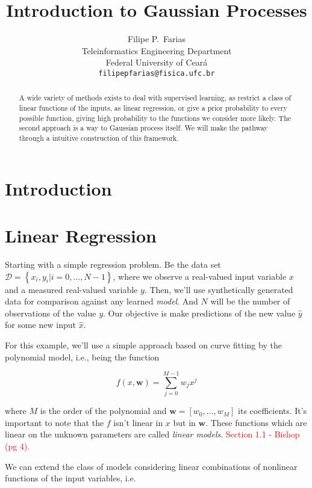 \documentclass[11pt]{article} %
\title{Introduction to Gaussian Processes}
\author{
Filipe P.~Farias \\
Teleinformatics Engineering Department\\
Federal University of Ceará\\
\texttt{filipepfarias@fisica.ufc.br} \\
}
\begin{document}
\maketitle

\begin{abstract}
   A wide variety of methods exists to deal with supervised learning, as restrict a class of linear functions of the inputs, as linear regression, or give a prior probability to every possible function, giving high probability to the functions we consider more likely. The second approach is a way to Gaussian process itself. We will make the pathway through a intuitive construction of this framework.
\end{abstract}

\section{Introduction}

\lipsum[1]%

\section{Linear Regression}

Starting with a simple regression problem. Be the data set $\mathcal{D}=\left\{ x_i,y_i|i=0,\dots,N-1 \right\}$, where we observe a real-valued input variable $x$ and a measured real-valued variable $y$. Then, we'll use synthetically generated data for comparison against any learned \textit{model}. And $N$ will be the number of observations of the value $y$. Our objective is make predictions of the new value $\hat{y}$ for some new input $\hat{x}$.

For this example, we'll use a simple approach based on curve fitting by the polynomial model, i.e., being the function

\begin{equation}
   f(x,\mathbf{w}) = \sum_{j=0}^{M-1} w_j x^j
\end{equation}

where $M$ is the order of the polynomial and $\mathbf{w}=\left[ w_0,\dots,w_M \right]$ its coefficients. It's important to note that the $f$ isn't linear in $x$ but in $\mathbf{w}$. These functions which are linear on the unknown parameters are called \textit{linear models}.
\textcolor{red}{Section 1.1 - Bishop (pg 4).}

We can extend the class of models considering linear combinations of nonlinear functions of the input variables, i.e.
\end{document}
